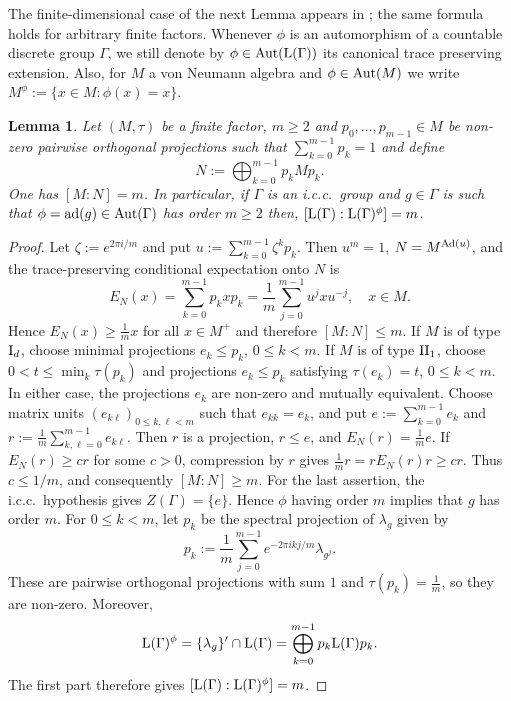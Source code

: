 \documentclass[12pt]{amsart} %
\theoremstyle{plain}
\newtheorem{lemma}[theorem]{Lemma}
\theoremstyle{definition}
\newcommand{\LL}{{\rm L}}
\newcommand{\Aut}{{\rm Aut}}
\newcommand{\Ad}{{\rm Ad}}
\begin{document}
\noindent The finite-dimensional case of the next Lemma appears in
\cite[Example~6.5(2), p.~94]{pimsnerpopa}; the same formula holds for
arbitrary finite factors.
\medskip
\noindent Whenever $\phi$ is an automorphism of a countable discrete group $\Gamma$, we still denote by $\phi\in\Aut(\LL(\Gamma))$ its canonical trace preserving extension. Also, for $M$ a von Neumann algebra and $\phi\in\Aut(M)$ we write $M^\phi:=\{x\in M:\phi(x)=x\}$.
\begin{lemma}\label{lem:index}
Let $(M,\tau)$ be a finite factor, $m\geq2$ and $p_0,\ldots,p_{m-1}\in M$ be non-zero pairwise orthogonal projections such
that $\sum_{k=0}^{m-1}p_k=1$ and define
$$N:=\bigoplus_{k=0}^{m-1}p_kMp_k.$$
One has $[M:N]=m$. In particular, if $\Gamma$ is an i.c.c.\ group and $g\in\Gamma$ is such that
$\phi=\operatorname{ad}(g)\in\Aut(\Gamma)$ has order $m\geq2$ then, $[\LL(\Gamma):\LL(\Gamma)^\phi]=m$.
\end{lemma}
\begin{proof}
Let $\zeta:=e^{2\pi i/m}$ and put $u:=\sum_{k=0}^{m-1}\zeta^kp_k$. Then $u^m=1$, $N=M^{\Ad(u)}$, and the trace-preserving conditional
expectation onto $N$ is
$$
E_N(x)
=
\sum_{k=0}^{m-1}p_kxp_k
=
\frac1m\sum_{j=0}^{m-1}u^jxu^{-j},
\quad x\in M.
$$
Hence $E_N(x)\geq\frac1m x$ for all $x\in M^+$ and therefore $[M:N]\leq m$.
\medskip
\noindent If $M$ is of type ${\rm I}_d$, choose minimal projections
$e_k\leq p_k$, $0\leq k<m$. If $M$ is of type ${\rm II}_1$, choose
$0<t\leq\min_k\tau(p_k)$ and projections $e_k\leq p_k$ satisfying
$\tau(e_k)=t$, $0\leq k<m$. In either case, the projections $e_k$ are
non-zero and mutually equivalent. Choose matrix units
$(e_{k\ell})_{0\leq k,\ell<m}$ such that $e_{kk}=e_k$, and put $e:=\sum_{k=0}^{m-1}e_k$ and $r:=\frac1m\sum_{k,\ell=0}^{m-1}e_{k\ell}$.
Then $r$ is a projection, $r\leq e$, and $E_N(r)=\frac1m e$. If $E_N(r)\geq cr$ for some $c>0$, compression by $r$ gives
$\frac1m r
=rE_N(r)r
\geq cr$. Thus $c\leq1/m$, and consequently $[M:N]\geq m$.
\medskip
\noindent For the last assertion, the i.c.c.\ hypothesis gives
$Z(\Gamma)=\{e\}$. Hence $\phi$ having order $m$ implies that
$g$ has order $m$. For $0\leq k<m$, let $p_k$ be the spectral projection
of $\lambda_g$ given by
$$
p_k
:=
\frac1m\sum_{j=0}^{m-1}e^{-2\pi ikj/m}\lambda_{g^j}.
$$
These are pairwise orthogonal projections with sum $1$ and
$\tau(p_k)=\frac1m$, so they are non-zero. Moreover,
$$\LL(\Gamma)^\phi
=
\{\lambda_g\}'\cap\LL(\Gamma)
=
\bigoplus_{k=0}^{m-1}p_k\LL(\Gamma)p_k.$$
The first part therefore gives $[\LL(\Gamma):\LL(\Gamma)^\phi]=m$.
\end{proof}
\end{document}
